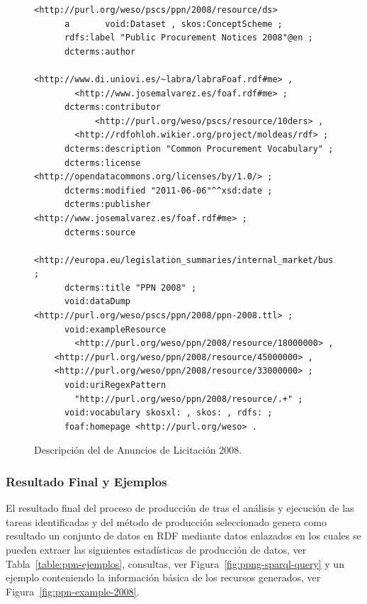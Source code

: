 \begin{figure}[!htp]
\begin{lstlisting} 
<http://purl.org/weso/pscs/ppn/2008/resource/ds>
      a       void:Dataset , skos:ConceptScheme ;
      rdfs:label "Public Procurement Notices 2008"@en ;
      dcterms:author 
            <http://www.di.uniovi.es/~labra/labraFoaf.rdf#me> , 
	    <http://www.josemalvarez.es/foaf.rdf#me> ;
      dcterms:contributor
            <http://purl.org/weso/pscs/resource/10ders> ,
	    <http://rdfohloh.wikier.org/project/moldeas/rdf> ;
      dcterms:description "Common Procurement Vocabulary" ;
      dcterms:license <http://opendatacommons.org/licenses/by/1.0/> ;
      dcterms:modified "2011-06-06"^^xsd:date ;
      dcterms:publisher <http://www.josemalvarez.es/foaf.rdf#me> ;
      dcterms:source 
	<http://europa.eu/legislation_summaries/internal_market/businesses/public_procurement/l22008_en.htm> ;
      dcterms:title "PPN 2008" ;
      void:dataDump <http://purl.org/weso/pscs/ppn/2008/ppn-2008.ttl> ;
      void:exampleResource
        <http://purl.org/weso/ppn/2008/resource/18000000> , 
	<http://purl.org/weso/ppn/2008/resource/45000000> , 
	<http://purl.org/weso/ppn/2008/resource/33000000> ;
      void:uriRegexPattern
        "http://purl.org/weso/ppn/2008/resource/.+" ;
      void:vocabulary skosxl: , skos: , rdfs: ;
      foaf:homepage <http://purl.org/weso> .
\end{lstlisting}
	\caption{Descripción del \dataset de Anuncios de Licitación 2008.}
	\label{fig:ppn-ds-2008}
\end{figure}
 
\cleardoublepage
% 
\subsubsection{Resultado Final y Ejemplos}
El resultado final del proceso de producción de \linkeddata tras el análisis y ejecución 
de las tareas identificadas y del método de producción seleccionado genera como resultado un conjunto de 
datos en \gls{RDF} mediante datos enlazados en los cuales se pueden extraer las siguientes 
estadísticas de producción de datos, ver Tabla~\ref{table:ppn-ejemplos}, consultas, ver Figura~\ref{fig:ppng-sparql-query} y un 
ejemplo conteniendo la información básica de los recursos generados, ver Figura~\ref{fig:ppn-example-2008}. 

